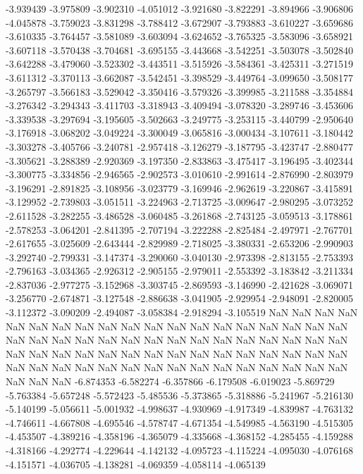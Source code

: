 -3.939439
-3.975809
-3.902310
-4.051012
-3.921680
-3.822291
-3.894966
-3.906806
-4.045878
-3.759023
-3.831298
-3.788412
-3.672907
-3.793883
-3.610227
-3.659686
-3.610335
-3.764457
-3.581089
-3.603094
-3.624652
-3.765325
-3.583096
-3.658921
-3.607118
-3.570438
-3.704681
-3.695155
-3.443668
-3.542251
-3.503078
-3.502840
-3.642288
-3.479060
-3.523302
-3.443511
-3.515926
-3.584361
-3.425311
-3.271519
-3.611312
-3.370113
-3.662087
-3.542451
-3.398529
-3.449764
-3.099650
-3.508177
-3.265797
-3.566183
-3.529042
-3.350416
-3.579326
-3.399985
-3.211588
-3.354884
-3.276342
-3.294343
-3.411703
-3.318943
-3.409494
-3.078320
-3.289746
-3.453606
-3.339538
-3.297694
-3.195605
-3.502663
-3.249775
-3.253115
-3.440799
-2.950640
-3.176918
-3.068202
-3.049224
-3.300049
-3.065816
-3.000434
-3.107611
-3.180442
-3.303278
-3.405766
-3.240781
-2.957418
-3.126279
-3.187795
-3.423747
-2.880477
-3.305621
-3.288389
-2.920369
-3.197350
-2.833863
-3.475417
-3.196495
-3.402344
-3.300775
-3.334856
-2.946565
-2.902573
-3.010610
-2.991614
-2.876990
-2.803979
-3.196291
-2.891825
-3.108956
-3.023779
-3.169946
-2.962619
-3.220867
-3.415891
-3.129952
-2.739803
-3.051511
-3.224963
-2.713725
-3.009647
-2.980295
-3.073252
-2.611528
-3.282255
-3.486528
-3.060485
-3.261868
-2.743125
-3.059513
-3.178861
-2.578253
-3.064201
-2.841395
-2.707194
-3.222288
-2.825484
-2.497971
-2.767701
-2.617655
-3.025609
-2.643444
-2.829989
-2.718025
-3.380331
-2.653206
-2.990903
-3.292740
-2.799331
-3.147374
-3.290060
-3.040130
-2.973398
-2.813155
-2.753393
-2.796163
-3.034365
-2.926312
-2.905155
-2.979011
-2.553392
-3.183842
-3.211334
-2.837036
-2.977275
-3.152968
-3.303745
-2.869593
-3.146990
-2.421628
-3.069071
-3.256770
-2.674871
-3.127548
-2.886638
-3.041905
-2.929954
-2.948091
-2.820005
-3.112372
-3.090209
-2.494087
-3.058384
-2.918294
-3.105519
NaN
NaN
NaN
NaN
NaN
NaN
NaN
NaN
NaN
NaN
NaN
NaN
NaN
NaN
NaN
NaN
NaN
NaN
NaN
NaN
NaN
NaN
NaN
NaN
NaN
NaN
NaN
NaN
NaN
NaN
NaN
NaN
NaN
NaN
NaN
NaN
NaN
NaN
NaN
NaN
NaN
NaN
NaN
NaN
NaN
NaN
NaN
NaN
NaN
NaN
NaN
NaN
NaN
NaN
NaN
NaN
NaN
NaN
NaN
NaN
NaN
NaN
NaN
NaN
NaN
NaN
NaN
-6.874353
-6.582274
-6.357866
-6.179508
-6.019023
-5.869729
-5.763384
-5.657248
-5.572423
-5.485536
-5.373865
-5.318886
-5.241967
-5.216130
-5.140199
-5.056611
-5.001932
-4.998637
-4.930969
-4.917349
-4.839987
-4.763132
-4.746611
-4.667808
-4.695546
-4.578747
-4.671354
-4.549985
-4.563190
-4.515305
-4.453507
-4.389216
-4.358196
-4.365079
-4.335668
-4.368152
-4.285455
-4.159288
-4.318166
-4.292774
-4.229644
-4.142132
-4.095723
-4.115224
-4.095030
-4.076168
-4.151571
-4.036705
-4.138281
-4.069359
-4.058114
-4.065139
